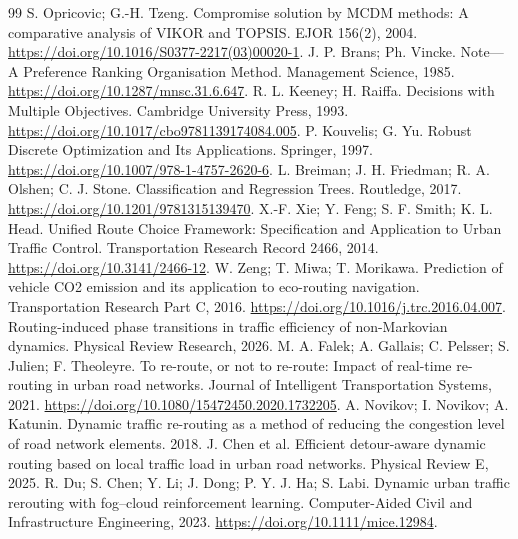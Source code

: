 \documentclass[10pt,a4paper]{article}
\begin{document}
\begin{thebibliography}{99}
 S. Opricovic; G.-H. Tzeng. Compromise solution by MCDM methods: A comparative analysis of VIKOR and TOPSIS. EJOR 156(2), 2004. \url{https://doi.org/10.1016/S0377-2217(03)00020-1}.
 J. P. Brans; Ph. Vincke. Note---A Preference Ranking Organisation Method. Management Science, 1985. \url{https://doi.org/10.1287/mnsc.31.6.647}.
 R. L. Keeney; H. Raiffa. Decisions with Multiple Objectives. Cambridge University Press, 1993. \url{https://doi.org/10.1017/cbo9781139174084.005}.
 P. Kouvelis; G. Yu. Robust Discrete Optimization and Its Applications. Springer, 1997. \url{https://doi.org/10.1007/978-1-4757-2620-6}.
 L. Breiman; J. H. Friedman; R. A. Olshen; C. J. Stone. Classification and Regression Trees. Routledge, 2017. \url{https://doi.org/10.1201/9781315139470}.
 X.-F. Xie; Y. Feng; S. F. Smith; K. L. Head. Unified Route Choice Framework: Specification and Application to Urban Traffic Control. Transportation Research Record 2466, 2014. \url{https://doi.org/10.3141/2466-12}.
 W. Zeng; T. Miwa; T. Morikawa. Prediction of vehicle CO2 emission and its application to eco-routing navigation. Transportation Research Part C, 2016. \url{https://doi.org/10.1016/j.trc.2016.04.007}.
 Routing-induced phase transitions in traffic efficiency of non-Markovian dynamics. Physical Review Research, 2026.
 M. A. Falek; A. Gallais; C. Pelsser; S. Julien; F. Theoleyre. To re-route, or not to re-route: Impact of real-time re-routing in urban road networks. Journal of Intelligent Transportation Systems, 2021. \url{https://doi.org/10.1080/15472450.2020.1732205}.
 A. Novikov; I. Novikov; A. Katunin. Dynamic traffic re-routing as a method of reducing the congestion level of road network elements. 2018.
 J. Chen et al. Efficient detour-aware dynamic routing based on local traffic load in urban road networks. Physical Review E, 2025.
 R. Du; S. Chen; Y. Li; J. Dong; P. Y. J. Ha; S. Labi. Dynamic urban traffic rerouting with fog--cloud reinforcement learning. Computer-Aided Civil and Infrastructure Engineering, 2023. \url{https://doi.org/10.1111/mice.12984}.
\end{thebibliography}
\end{document}
